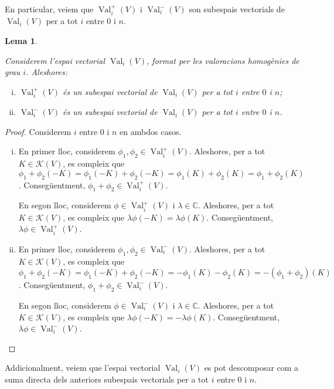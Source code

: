 \documentclass{article}
\newtheorem{lema}{Lema}
\theoremstyle{definition}
\DeclareMathOperator{\Val}{Val}
\begin{document}
En particular, veiem que $\Val_i^+(V)$ i $\Val_i^-(V)$ son subespais vectorials de $\Val_i(V)$ per a tot $i$ entre $0$ i $n$.

\begin{lema}\label{Lem:subespai+-}

Considerem l'espai vectorial $\Val_i(V)$, format per les valoracions homog\`{e}nies de grau $i$. Aleshores:

\begin{enumerate} [(i)]
    \item $\Val_i^+(V)$ \'{e}s un subespai vectorial de $\Val_i(V)$ per a tot $i$ entre $0$ i $n$;
    \item $\Val_i^-(V)$ \'{e}s un subespai vectorial de $\Val_i(V)$ per a tot $i$ entre $0$ i $n$.
\end{enumerate}
\end{lema}

\begin{proof}
Considerem $i$ entre $0$ i $n$ en ambdos casos.
\begin{enumerate} [(i)]
    \item En primer lloc, considerem $\phi_1, \phi_2 \in \Val_i^+(V)$. Aleshores, per a tot $K\in\mathcal{K}(V)$, es compleix que $\phi_1 + \phi_2 (-K) = \phi_1(-K) + \phi_2(-K) = \phi_1(K) + \phi_2(K) = \phi_1 + \phi_2 (K)$. Conseg\"{u}entment, $\phi_1 + \phi_2 \in \Val_i^+(V)$.
    
    En segon lloc, considerem $\phi \in \Val_i^+(V)$ i $\lambda \in \mathbb{C}$. Aleshores, per a tot $K \in \mathcal{K}(V)$, es compleix que $\lambda \phi(-K) = \lambda \phi(K)$. Conseg\"{u}entment, $\lambda\phi \in \Val_i^+(V)$.
    
    \item En primer lloc, considerem $\phi_1, \phi_2 \in \Val_i^-(V)$. Aleshores, per a tot $K\in\mathcal{K}(V)$, es compleix que $\phi_1 + \phi_2 (-K) = \phi_1(-K) + \phi_2(-K) = -\phi_1(K) - \phi_2(K) = - (\phi_1 + \phi_2) (K)$. Conseg\"{u}entment, $\phi_1 + \phi_2 \in \Val_i^-(V)$.
    
    En segon lloc, considerem $\phi \in \Val_i^-(V)$ i $\lambda \in \mathbb{C}$. Aleshores, per a tot $K \in \mathcal{K}(V)$, es compleix que $\lambda \phi(-K) = - \lambda \phi(K)$. Conseg\"{u}entment, $\lambda\phi \in \Val_i^-(V)$.
\end{enumerate}
\end{proof}

Addicionalment, veiem que l'espai vectorial $\Val_i(V)$ es pot descomposar com a suma directa dels anteriors subespais vectorials per a tot $i$ entre $0$ i $n$.
\end{document}
